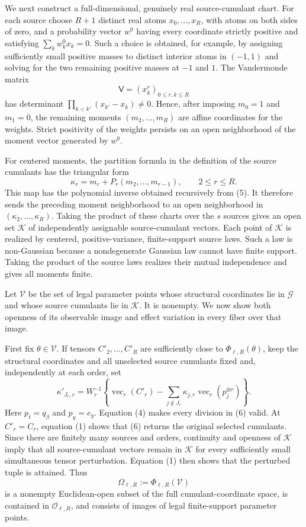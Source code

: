 We next construct a full-dimensional, genuinely real source-cumulant chart.  For each source choose \(R+1\) distinct real atoms \(x_0,\ldots,x_R\), with atoms on both sides of zero, and a probability vector \(w^0\) having every coordinate strictly positive and satisfying \(\sum_k w^0_kx_k=0\).  Such a choice is obtained, for example, by assigning sufficiently small positive masses to distinct interior atoms in \((-1,1)\) and solving for the two remaining positive masses at \(-1\) and \(1\).  The Vandermonde matrix
\[
 \mathsf V=(x_k^r)_{0\le r,k\le R}
\]
has determinant \(\prod_{k<k'}(x_{k'}-x_k)\ne0\).  Hence, after imposing \(m_0=1\) and \(m_1=0\), the remaining moments \((m_2,\ldots,m_R)\) are affine coordinates for the weights.  Strict positivity of the weights persists on an open neighborhood of the moment vector generated by \(w^0\).

For centered moments, the partition formula in the definition of the source cumulants has the triangular form
\[
 \kappa_r=m_r+P_r(m_2,\ldots,m_{r-1}),\qquad 2\le r\le R.
 \tag{5}
\]
This map has the polynomial inverse obtained recursively from (5).  It therefore sends the preceding moment neighborhood to an open neighborhood in \((\kappa_2,\ldots,\kappa_R)\).  Taking the product of these charts over the \(s\) sources gives an open set \(\mathcal K\) of independently assignable source-cumulant vectors.  Each point of \(\mathcal K\) is realized by centered, positive-variance, finite-support source laws.  Such a law is non-Gaussian because a nondegenerate Gaussian law cannot have finite support.  Taking the product of the source laws realizes their mutual independence and gives all moments finite.

Let \(\mathcal V\) be the set of legal parameter points whose structural coordinates lie in \(\mathcal G\) and whose source cumulants lie in \(\mathcal K\).  It is nonempty.  We now show both openness of its observable image and effect variation in every fiber over that image.

First fix \(\theta\in\mathcal V\).  If tensors \(C'_2,\ldots,C'_R\) are sufficiently close to \(\Phi_{\ell,R}(\theta)\), keep the structural coordinates and all unselected source cumulants fixed and, independently at each order, set
\[
 \kappa'_{J_r,r}
 =W_r^{-1}\left\{\operatorname{vec}_r(C'_r)
 -\sum_{j\notin J_r}\kappa_{j,r}\operatorname{vec}_r(p_j^{\otimes r})\right\}.
 \tag{6}
\]
Here \(p_t=q_\beta\) and \(p_y=e_y\).  Equation (4) makes every division in (6) valid.  At \(C'_r=C_r\), equation (1) shows that (6) returns the original selected cumulants.  Since there are finitely many sources and orders, continuity and openness of \(\mathcal K\) imply that all source-cumulant vectors remain in \(\mathcal K\) for every sufficiently small simultaneous tensor perturbation.  Equation (1) then shows that the perturbed tuple is attained.  Thus
\[
 \Omega_{\ell,R}:=\Phi_{\ell,R}(\mathcal V)
 \tag{7}
\]
is a nonempty Euclidean-open subset of the full cumulant-coordinate space, is contained in \(\mathcal O_{\ell,R}\), and consists of images of legal finite-support parameter points.

